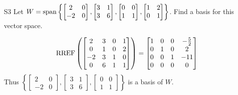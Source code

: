 \begin{problem}{S3}
Let \(
  W={\rm span}\left\{
    \begin{bmatrix} 2 & 0 \\ -2 & 0 \end{bmatrix},
    \begin{bmatrix} 3 & 1 \\ 3 & 6 \end{bmatrix},
    \begin{bmatrix} 0 & 0 \\ 1 & 1 \end{bmatrix},
    \begin{bmatrix} 1 & 2 \\ 0 & 1 \end{bmatrix}
  \right\}
\). Find a basis for this vector space.
\end{problem}
\begin{solution}
\[
  \operatorname{RREF}\left(\begin{bmatrix}
    2 & 3 & 0 & 1 \\
    0 & 1 & 0 & 2 \\
    -2 & 3 & 1 & 0 \\
    0 & 6 & 1 & 1
  \end{bmatrix} \right) =
  \begin{bmatrix}
    1 & 0 & 0 & -\frac{5}{2} \\
    0 & 1 & 0 & 2 \\
    0 & 0 & 1 & -11\\
    0 & 0 & 0 & 0
  \end{bmatrix}
\]
Thus \(\left\{
  \begin{bmatrix} 2 & 0 \\ -2 & 0 \end{bmatrix},
  \begin{bmatrix} 3 & 1 \\ 3 & 6 \end{bmatrix},
  \begin{bmatrix} 0 & 0 \\ 1 & 1 \end{bmatrix}
\right\}\) is a basis of $W$.
\end{solution}


